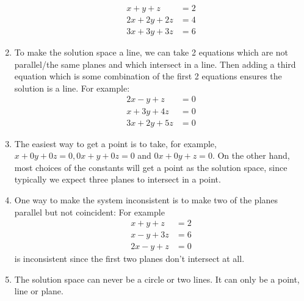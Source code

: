 \begin{SaveQuestion}
\begin{enumerate}
        $$\begin{aligned}  x +  y +  z &= 2\\
	 	2x + 2y + 2 z &= 4 \\
	 	3 x + 3 y + 3 z &= 6 \end{aligned}$$ 
        \item To make the solution space a line, we can take 2 equations which are not parallel/the same planes and which intersect in a line. Then adding a third equation which is some combination of the first 2 equations ensures the solution is a line. For example: 
	   $$\begin{aligned} 2x - y + z &= 0\\
	   x + 3y + 4 z &= 0 \\
	   3x + 2y + 5z &= 0
	   \end{aligned}$$
        \item The easiest way to get a point is to take, for example, $x + 0y + 0z = 0, 0x + y + 0z = 0 $ and $0x + 0 y + z = 0$. On the other hand, most choices of the constants will get a point as the solution space, since typically we expect three planes to intersect in a point. 
        \item One way to make the system inconsistent is to make two of the planes parallel but not coincident: For example
	 $$\begin{aligned}  x +  y +  z &= 2\\
	 x - y +  3 z &= 6 \\ 2x - y + z &= 0 \end{aligned}$$ 
	 is inconsistent since the first two planes don't intersect at all. 
        \item The solution space can never be a circle or two lines. It can only be a point, line or plane.
     \end{enumerate}
\end{SaveQuestion}




